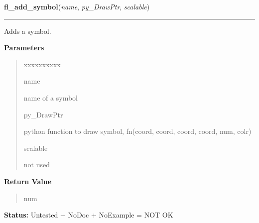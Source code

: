     \label{xformslib:library:fl_add_symbol}

    \vspace{0.5ex}

\hspace{.8\funcindent}\begin{boxedminipage}{\funcwidth}

    \raggedright \textbf{fl\_add\_symbol}(\textit{name}, \textit{py\_DrawPtr}, \textit{scalable})

    \vspace{-1.5ex}

    \rule{\textwidth}{0.5\fboxrule}
\setlength{\parskip}{2ex}
    Adds a symbol.

\setlength{\parskip}{1ex}
      \textbf{Parameters}
      \vspace{-1ex}

      \begin{quote}
        \begin{Ventry}{xxxxxxxxxx}

          \item[name]

          name of a symbol

          \item[py\_DrawPtr]

          python function to draw symbol, fn(coord, coord, coord, coord, 
          num, colr)

          \item[scalable]

          not used

        \end{Ventry}

      \end{quote}

      \textbf{Return Value}
    \vspace{-1ex}

      \begin{quote}
      num

      \end{quote}

\textbf{Status:} Untested + NoDoc + NoExample = NOT OK



    \end{boxedminipage}

    \label{xformslib:library:fl_draw_symbol}

